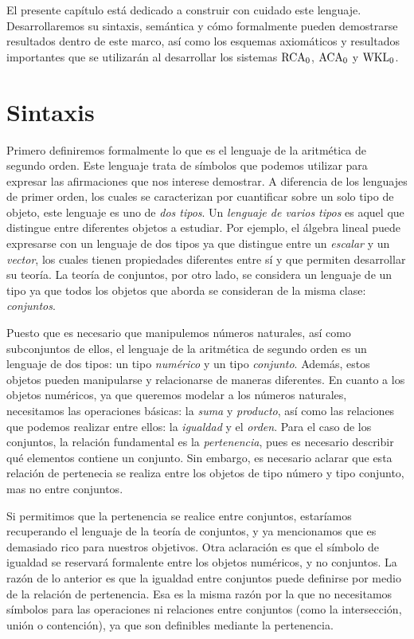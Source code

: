 El presente capítulo está dedicado a construir con cuidado este lenguaje. Desarrollaremos su sintaxis, semántica y cómo formalmente pueden demostrarse resultados dentro de este marco, así como los esquemas axiomáticos y resultados importantes que se utilizarán al desarrollar los sistemas $\mathrm{RCA}_{0}$, $\mathrm{ACA}_{0}$ y $\mathrm{WKL}_{0}$.

\section{Sintaxis}

Primero definiremos formalmente lo que es el lenguaje de la aritmética de segundo orden. Este lenguaje trata de símbolos que podemos utilizar para expresar las afirmaciones que nos interese demostrar. A diferencia de los lenguajes de primer orden, los cuales se caracterizan por cuantificar sobre un solo tipo de objeto, este lenguaje es uno de \emph{dos tipos}. Un \emph{lenguaje de varios tipos} es aquel que distingue entre diferentes objetos a estudiar. Por ejemplo, el álgebra lineal puede expresarse con un lenguaje de dos tipos ya que distingue entre un \emph{escalar} y un \emph{vector}, los cuales tienen propiedades diferentes entre sí y que permiten desarrollar su teoría. La teoría de conjuntos, por otro lado, se considera un lenguaje de un tipo ya que todos los objetos que aborda se consideran de la misma clase: \emph{conjuntos}. 

Puesto que es necesario que manipulemos números naturales, así como subconjuntos de ellos, el lenguaje de la aritmética de segundo orden es un lenguaje de dos tipos: un tipo \emph{numérico} y un tipo \emph{conjunto}. Además, estos objetos pueden manipularse y relacionarse de maneras diferentes. En cuanto a los objetos numéricos, ya que queremos modelar a los números naturales, necesitamos las operaciones básicas: la \emph{suma} y \emph{producto}, así como las relaciones que podemos realizar entre ellos: la \emph{igualdad} y el \emph{orden}. Para el caso de los conjuntos, la relación fundamental es la \emph{pertenencia}, pues es necesario describir qué elementos contiene un conjunto. Sin embargo, es necesario aclarar que esta relación de pertenecia se realiza entre los objetos de tipo número y tipo conjunto, mas no entre conjuntos. 

Si permitimos que la pertenencia se realice entre conjuntos, estaríamos recuperando el lenguaje de la teoría de conjuntos, y ya mencionamos que es demasiado rico para nuestros objetivos. Otra aclaración es que el símbolo de igualdad se reservará formalente entre los objetos numéricos, y no conjuntos. La razón de lo anterior es que la igualdad entre conjuntos puede definirse por medio de la relación de pertenencia. Esa es la misma razón por la que no necesitamos símbolos para las operaciones ni relaciones entre conjuntos (como la intersección, unión o contención), ya que son definibles mediante la pertenencia.

